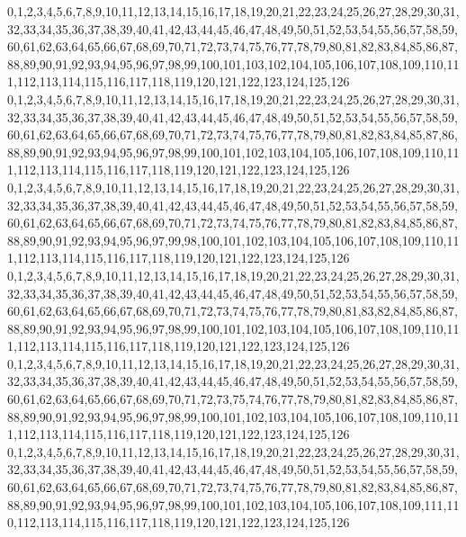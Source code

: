 \documentclass[12pt]{article}
\begin{document}
{0,1,2,3,4,5,6,7,8,9,10,11,12,13,14,15,16,17,18,19,20,21,22,23,24,25,26,27,28,29,30,31,32,33,34,35,36,37,38,39,40,41,42,43,44,45,46,47,48,49,50,51,52,53,54,55,56,57,58,59,60,61,62,63,64,65,66,67,68,69,70,71,72,73,74,75,76,77,78,79,80,81,82,83,84,85,86,87,88,89,90,91,92,93,94,95,96,97,98,99,100,101,103,102,104,105,106,107,108,109,110,111,112,113,114,115,116,117,118,119,120,121,122,123,124,125,126\\
0,1,2,3,4,5,6,7,8,9,10,11,12,13,14,15,16,17,18,19,20,21,22,23,24,25,26,27,28,29,30,31,32,33,34,35,36,37,38,39,40,41,42,43,44,45,46,47,48,49,50,51,52,53,54,55,56,57,58,59,60,61,62,63,64,65,66,67,68,69,70,71,72,73,74,75,76,77,78,79,80,81,82,83,84,85,87,86,88,89,90,91,92,93,94,95,96,97,98,99,100,101,102,103,104,105,106,107,108,109,110,111,112,113,114,115,116,117,118,119,120,121,122,123,124,125,126\\
0,1,2,3,4,5,6,7,8,9,10,11,12,13,14,15,16,17,18,19,20,21,22,23,24,25,26,27,28,29,30,31,32,33,34,35,36,37,38,39,40,41,42,43,44,45,46,47,48,49,50,51,52,53,54,55,56,57,58,59,60,61,62,63,64,65,66,67,68,69,70,71,72,73,74,75,76,77,78,79,80,81,82,83,84,85,86,87,88,89,90,91,92,93,94,95,96,97,99,98,100,101,102,103,104,105,106,107,108,109,110,111,112,113,114,115,116,117,118,119,120,121,122,123,124,125,126\\
0,1,2,3,4,5,6,7,8,9,10,11,12,13,14,15,16,17,18,19,20,21,22,23,24,25,26,27,28,29,30,31,32,33,34,35,36,37,38,39,40,41,42,43,44,45,46,47,48,49,50,51,52,53,54,55,56,57,58,59,60,61,62,63,64,65,66,67,68,69,70,71,72,73,74,75,76,77,78,79,80,81,83,82,84,85,86,87,88,89,90,91,92,93,94,95,96,97,98,99,100,101,102,103,104,105,106,107,108,109,110,111,112,113,114,115,116,117,118,119,120,121,122,123,124,125,126\\
0,1,2,3,4,5,6,7,8,9,10,11,12,13,14,15,16,17,18,19,20,21,22,23,24,25,26,27,28,29,30,31,32,33,34,35,36,37,38,39,40,41,42,43,44,45,46,47,48,49,50,51,52,53,54,55,56,57,58,59,60,61,62,63,64,65,66,67,68,69,70,71,72,73,75,74,76,77,78,79,80,81,82,83,84,85,86,87,88,89,90,91,92,93,94,95,96,97,98,99,100,101,102,103,104,105,106,107,108,109,110,111,112,113,114,115,116,117,118,119,120,121,122,123,124,125,126\\
0,1,2,3,4,5,6,7,8,9,10,11,12,13,14,15,16,17,18,19,20,21,22,23,24,25,26,27,28,29,30,31,32,33,34,35,36,37,38,39,40,41,42,43,44,45,46,47,48,49,50,51,52,53,54,55,56,57,58,59,60,61,62,63,64,65,66,67,68,69,70,71,72,73,74,75,76,77,78,79,80,81,82,83,84,85,86,87,88,89,90,91,92,93,94,95,96,97,98,99,100,101,102,103,104,105,106,107,108,109,111,110,112,113,114,115,116,117,118,119,120,121,122,123,124,125,126\\
}
\end{document}
